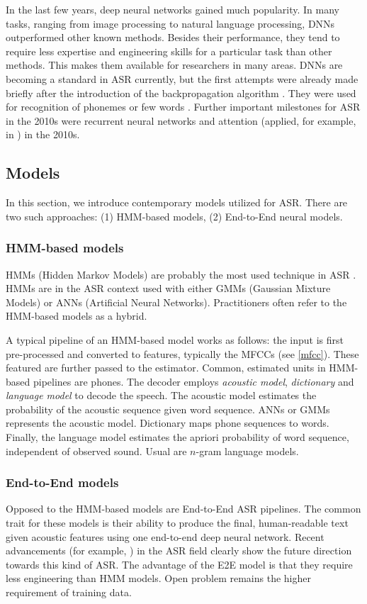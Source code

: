 In the last few years, deep neural networks gained much popularity. In many tasks, ranging from image processing to natural language processing, DNNs outperformed other known methods. Besides their performance, they tend to require less expertise and engineering skills for a particular task than other methods. This makes them available for researchers in many areas. DNNs are becoming a standard in ASR currently, but the first attempts were already made briefly after the introduction of the backpropagation algorithm . They were used for recognition of phonemes  or few words . Further important milestones for ASR in the 2010s were recurrent neural networks and attention (applied, for example, in ) in the 2010s.

\subsection{Models}
In this section, we introduce contemporary models utilized for ASR. There are two such approaches: (1) HMM-based models, (2) End-to-End neural models.

\subsubsection{HMM-based models}
HMMs (Hidden Markov Models) are probably the most used technique in ASR . HMMs are in the ASR context used with either GMMs (Gaussian Mixture Models)  or ANNs (Artificial Neural Networks).  Practitioners often refer to the HMM-based models as a hybrid.

A typical pipeline of an HMM-based model works as follows: the input is first pre-processed and converted to features, typically the MFCCs (see \cref{mfcc}). These featured are further passed to the estimator. Common, estimated units in HMM-based pipelines are phones. The decoder employs \emph{acoustic model}, \emph{dictionary} and \emph{language model} to decode the speech. The acoustic model estimates the probability of the acoustic sequence given word sequence. ANNs or GMMs represents the acoustic model. Dictionary maps phone sequences to words. Finally, the language model estimates the apriori probability of word sequence, independent of observed sound. Usual are $n$-gram language models. 

\subsubsection{End-to-End models}
Opposed to the HMM-based models are End-to-End ASR pipelines. The common trait for these models is their ability to produce the final, human-readable text given acoustic features using one end-to-end deep neural network. Recent advancements (for example, ) in the ASR field clearly show the future direction towards this kind of ASR. The advantage of the E2E model is that they require less engineering than HMM models. Open problem remains the higher requirement of training data.

